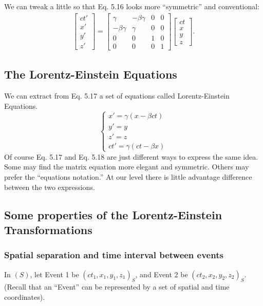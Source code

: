 \documentclass[a4paper,11pt]{article}
\numberwithin{equation}{section}
\begin{document}
 We can tweak a little so that Eq. 5.16 looks more ``symmetric'' and conventional:
 \begin{gather}
 \begin{bmatrix} ct' \\ x' \\ y' \\ z' \end{bmatrix}
 =
 \begin{bmatrix}
 \gamma & -\beta\gamma & 0 & 0\\
 -\beta\gamma & \gamma & 0 & 0\\
 0 & 0 & 1 & 0\\
 0 & 0 & 0 & 1
 \end{bmatrix}
 \begin{bmatrix}
 ct \\x \\ y \\ z
 \end{bmatrix}.
 \end{gather}

 \subsection{The Lorentz-Einstein Equations}
 We can extract from Eq. 5.17 a set of equations called Lorentz-Einstein Equations.
 \begin{equation}
 \begin{cases}
 x'=\gamma(x-\beta ct)\\
 y'=y\\
 z'=z\\
 ct'=\gamma(ct-\beta x)
 \end{cases}
 \end{equation}
 Of course Eq. 5.17 and Eq. 5.18 are just different ways to express the same idea. Some may find the matrix equation more elegant and symmetric. Others may prefer the ``equations notation.'' At our level there is little advantage difference between the two expressions. 
 
 \subsection{Some properties of the Lorentz-Einstein Transformations}
 \subsubsection{Spatial separation and time interval between events}
 In $(S)$, let Event 1 be $(ct_1, x_1, y_1, z_1)_S$, and Event 2 be $(ct_2, x_2, y_2, z_2)_{S}$. (Recall that an ``Event'' can be represented by a set of spatial and time coordinates).
 
\end{document}
